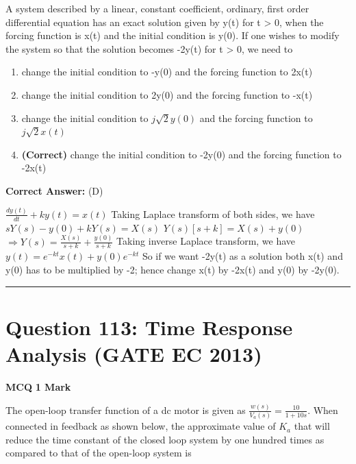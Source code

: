 \documentclass[11pt,a4paper]{article}
\begin{document}
\noindent A system described by a linear, constant coefficient, ordinary, first order differential equation has an exact solution given by y(t) for t > 0, when the forcing function is x(t) and the initial condition is y(0). If one wishes to modify the system so that the solution becomes -2y(t) for t > 0, we need to


\begin{enumerate}[label=(\Alph*)]
    \item change the initial condition to -y(0) and the forcing function to 2x(t)
    \item change the initial condition to 2y(0) and the forcing function to -x(t)
    \item change the initial condition to $j\sqrt{2}y\left ( 0 \right )$ and the forcing function to $j\sqrt{2}x\left ( t \right )$
    \item \textbf{(Correct)} change the initial condition to -2y(0) and the forcing function to -2x(t)
\end{enumerate}

\noindent \textbf{Correct Answer:} (D)

\begin{tcolorbox}[solbox, title=Detailed Solution -- Question 112]
$\frac{d y(t)}{d t}+k y(t)=x(t)$
 Taking Laplace transform of both sides, we have 
$s Y(s)-y(0)+k Y(s)=X(s)$
$Y(s)[s+k]=X(s)+y(0)$
$\Rightarrow Y(s)=\frac{X(s)}{s+k}+\frac{y(0)}{s+k}$
 Taking inverse Laplace transform, we have 
$y(t)=e^{-k t} x(t)+y(0) e^{-k t}$
 So if we want -2y(t) as a solution both x(t) and  y(0) has to be multiplied by -2; hence change x(t) by -2x(t) and y(0) by -2y(0).
\end{tcolorbox}

\vspace{1.5em}
\hrule
\vspace{1.5em}

\section*{Question 113: Time Response Analysis (GATE EC 2013)}
\noindent \textbf{\color{primary}MCQ} \hfill \textbf{\color{secondary}1 Mark}


\noindent The open-loop transfer function of a dc motor is given as $\frac{w\left ( s \right )}{V_{a}\left ( s \right )}= \frac{10}{1+10s}$. When connected in feedback as shown below, the approximate value of $K_{a}$ that will reduce the time constant of the closed loop system by one hundred times as compared to that of the open-loop system is
\end{document}
